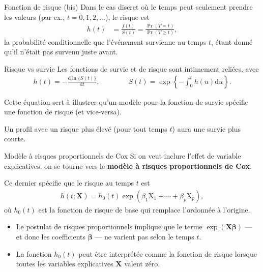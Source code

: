 \documentclass[
  ignorenonframetext,
]{beamer}
\providecommand{\tightlist}{%
  \setlength{\itemsep}{0pt}\setlength{\parskip}{0pt}}
\begin{document}
\begin{frame}{Fonction de risque (bis)}
\protect{}\label{fonction-de-risque-bis}
Dans le cas discret où le temps peut seulement prendre les valeurs (par
ex., \(t=0, 1, 2, \ldots\)), le risque est \begin{align*}
h(t) &= \frac{f(t)}{S(t)}=\frac{\Pr(T=t)}{\Pr(T \geq t)},
\end{align*} la probabilité conditionnelle que l'événement survienne au
temps \(t\), étant donné qu'il n'était pas survenu juste avant.
\end{frame}

\begin{frame}{Risque vs survie}
\protect{}\label{risque-vs-survie}
Les fonctions de survie et de risque sont intimement reliées, avec
\begin{align*}
h(t) = - \frac{\mathrm{d} \ln\{S(t)\}}{\mathrm{d} t}, \qquad \qquad S(t) = \exp \left\{ -\int_0^t h(u) \mathrm{d} u\right\}.
\end{align*}

Cette équation sert à illustrer qu'un modèle pour la fonction de survie
spécifie une fonction de risque (et vice-versa).

Un profil avec un risque plus élevé (pour tout temps \(t\)) aura une
survie plus courte.
\end{frame}

\begin{frame}{Modèle à risques proportionnels de Cox}
\protect{}\label{moduxe8le-uxe0-risques-proportionnels-de-cox}
Si on veut inclure l'effet de variable explicatives, on se tourne vers
le \textbf{modèle à risques proportionnels de Cox}.

Ce dernier spécifie que le risque au temps \(t\) est \begin{align*}
h(t; \mathbf{X}) = h_0(t)\exp(\beta_1\mathrm{X}_1 + \cdots + \beta_p \mathrm{X}_p),
\end{align*} où \(h_0(t)\) est la fonction de risque de base qui
remplace l'ordonnée à l'origine.

\begin{itemize}
\tightlist
\item
  Le postulat de risques proportionnels implique que le terme
  \(\exp(\mathbf{X}\boldsymbol{\beta})\) --- et donc les coefficients
  \(\boldsymbol{\beta}\) --- ne varient pas selon le temps \(t\).
\item
  La fonction \(h_0(t)\) peut être interprétée comme la fonction de
  risque lorsque toutes les variables explicatives \(\mathbf{X}\) valent
  zéro.
\end{itemize}
\end{frame}
\end{document}
